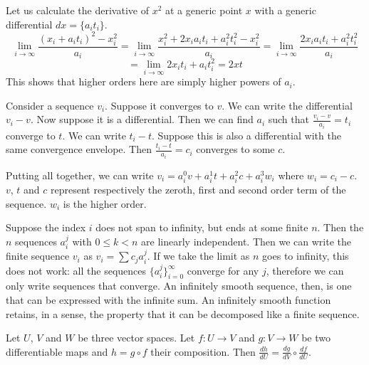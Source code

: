 \documentclass[11pt,letterpaper,fleqn]{memoir}
\begin{document}
\begin{remark}
	Let us calculate the derivative of $x^2$ at a generic point $x$ with a generic differential $dx = \{a_i t_i\}$.
	$$ \lim\limits_{i \to \infty} \frac{(x_i + a_i t_i)^2 - x_i^2}{a_i} = \lim\limits_{i \to \infty} \frac{x_i^2 + 2 x_i a_i t_i + a_i^2t_i^2 - x_i^2}{a_i} = \lim\limits_{i \to \infty} \frac{2 x_i a_i t_i + a_i^2t_i^2}{a_i}$$
	$$= \lim\limits_{i \to \infty} 2 x_i t_i + a_i t_i^2=2xt$$
	This shows that higher orders here are simply higher powers of $a_i$.
\end{remark}

\begin{remark}
	Consider a sequence $v_i$. Suppose it converges to $v$. We can write the differential $v_i - v$. Now suppose it is a differential. Then we can find $a_i$ such that $\frac{v_i - v}{a_i} = t_i$ converge to $t$. We can write $t_i - t$. Suppose this is also a differential with the same convergence envelope. Then $\frac{t_i - t}{a_i} = c_i$ converges to some $c$.
	
	Putting all together, we can write $v_i = a_i^0 v + a_i^1 t + a_i^2 c + a_i^3 w_i$ where $w_i = c_i - c$. $v$, $t$ and $c$ represent respectively the zeroth, first and second order term of the sequence. $w_i$ is the higher order.
	
	Suppose the index $i$ does not span to infinity, but ends at some finite $n$. Then the $n$ sequences $a_i^j$ with $0 \leq k < n$ are linearly independent. Then we can write the finite sequence $v_i$ as $v_i = \sum c_j a_i^j$. If we take the limit as $n$ goes to infinity, this does not work: all the sequences $\{a_i^j\}_{i=0}^\infty$ converge for any $j$, therefore we can only write sequences that converge. An infinitely smooth sequence, then, is one that can be expressed with the infinite sum. An infinitely smooth function retains, in a sense, the property that it can be decomposed like a finite sequence.
\end{remark}


\begin{prop}
	Let $U$, $V$ and $W$ be three vector spaces. Let $f : U \to V$ and $g : V \to W$ be two differentiable maps and $h = g \circ f$ their composition. Then $\frac{dh}{dU} = \frac{dg}{dV} \circ \frac{df}{dU}$.
\end{prop}
\end{document}

